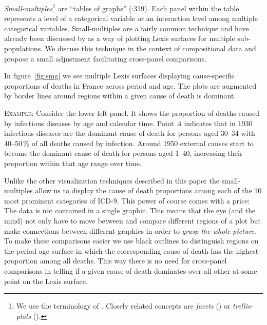 \documentclass[parskip=half]{scrartcl}
\begin{document}
\emph{Small-multiples}\footnote{
  We use the terminology of \textcite{Tufte1990}. Closely related concepts are \emph{facets} (\cite{Wilkinson2005}) or \emph{trellis-plots} (\cite{Becker1996}).
}
are \enquote{tables of graphs} (\cite{Wilkinson2005}:319). Each panel within the table represents a level of a categorical variable or an interaction level among multiple categorical variables. Small-multiples are a fairly common technique and have already been discussed by \textcite{Vaupel1987a} as a way of plotting Lexis surfaces for multiple sub-populations. We discuss this technique in the context of compositional data and propose a small adjustment facilitating cross-panel comparisons.

In figure~\ref{fig:smg} we see multiple Lexis surfaces displaying cause-specific proportions of deaths in France across period and age. The plots are augmented by border lines around regions within a given cause of death is dominant.

\textsc{Example:} Consider the lower left panel. It shows the proportion of deaths caused by infectious diseases by age and calendar time. Point \emph{A} indicates that in 1930 infectious diseases are the dominant cause of death for persons aged 30--34 with 40--50\,\% of all deaths caused by infection. Around 1950 external causes start to become the dominant cause of death for persons aged 1--40, increasing their proportion within that age range over time.

Unlike the other visualization techniques described in this paper the small-multiples allow us to display the cause of death proportions among each of the 10 most prominent categories of ICD-9. This power of course comes with a price: The data is not contained in a single graphic. This means that the eye (and the mind) not only have to move between and compare different regions of a plot but make connections between different graphics in order to \emph{grasp the whole picture}. To make these comparisons easier we use black outlines to distinguish regions on the period-age surface in which the corresponding cause of death has the highest proportion among all deaths. This way there is no need for cross-panel comparisons in telling if a given cause of death dominates over all other at some point on the Lexis surface.
\end{document}
